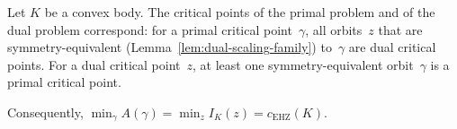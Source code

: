 \begin{theorem}%
\label{thm:primal-dual-equivalence}
Let $K$ be a convex body. The critical points of the primal problem and of the
dual problem correspond: for a primal critical point~$\gamma$, all orbits~$z$
that are symmetry-equivalent (Lemma~\ref{lem:dual-scaling-family}) to~$\gamma$
are dual critical points. For a dual critical point~$z$, at least one
symmetry-equivalent orbit~$\gamma$ is a primal critical point.

Consequently, $\min_\gamma A(\gamma) = \min_z I_K(z) = c_{\mathrm{EHZ}}(K)$.
\end{theorem}

